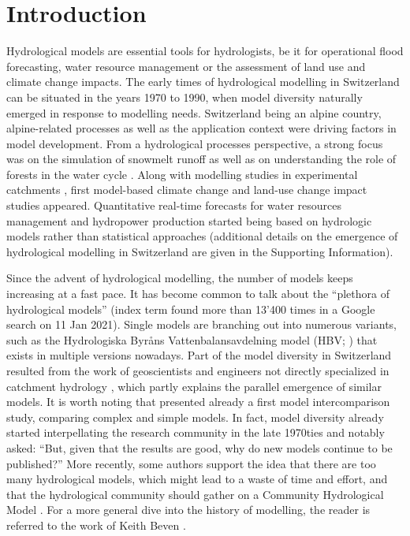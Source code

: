 \documentclass[10pt,a4paper]{article}
\begin{document}
\section{Introduction}
\label{sec:intro}

Hydrological models are essential tools for hydrologists, be it for operational flood forecasting, water resource management or the assessment of land use and climate change impacts. The early times of hydrological modelling in Switzerland can be situated in the years 1970 to 1990, when model diversity naturally emerged in response to modelling needs. Switzerland being an alpine country, alpine-related processes as well as the application context were driving factors in model development. From a hydrological processes perspective, a strong focus was on the simulation of snowmelt runoff \citep{Braun1986} as well as on understanding the role of forests in the water cycle \citep{Keller1991, Forster1989}. Along with modelling studies in experimental catchments \citep{Iorgulescu1994}, first model-based climate change \citep{Bultot1992a} and land-use change \citep{Jordan1990a} impact studies appeared. Quantitative real-time forecasts for water resources management \citep{Lugiez1969} and hydropower production \citep{Jensenlang1973} started being based on hydrologic models rather than statistical approaches (additional details on the emergence of hydrological modelling in Switzerland are given in the Supporting Information).

Since the advent of hydrological modelling, the number of models keeps increasing at a fast pace. It has become common to talk about the ``plethora of hydrological models'' (index term found more than 13'400 times in a Google search on 11 Jan 2021). Single models are branching out into numerous variants, such as the Hydrologiska Byråns Vattenbalansavdelning model (HBV; \citealp{Bergstrom1976a, Bergstrom1992, Bergstrom1995, Lindstrm1997})  that exists in multiple versions nowadays. Part of the model diversity in Switzerland resulted from the work of geoscientists and engineers not directly specialized in catchment hydrology \citep[][see Supplementary Information]{Abednego1990, Baumgartner1986a, Hager1984, Sautier1980}, which partly explains the parallel emergence of similar models. It is worth noting that \citet{Naef1977} presented already a first model intercomparison study, comparing complex and simple models. In fact, model diversity already started interpellating the research community in the late 1970ties and \citet{Naef1981} notably asked: ``But, given that the results are good, why do new models continue to be published?'' More recently, some authors support the idea that there are too many hydrological models, which might lead to a waste of time and effort, and that the hydrological community should gather on a Community Hydrological Model \citep{Weiler2015}. For a more general dive into the history of modelling, the reader is referred to the work of Keith Beven \citep{Beven2020,Beven2020a}.
\end{document}
